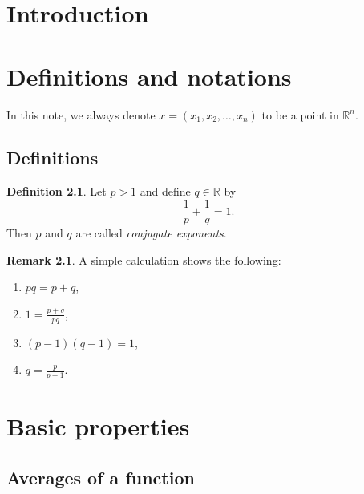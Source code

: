 \documentclass[11pt,a4paper]{report}
\theoremstyle{definition}
\newtheorem{definition}[theorem]{Definition}
\newtheorem{remark}[theorem]{Remark}
\begin{document}
\newpage 

\chapter{Introduction} 


\chapter{Definitions and notations} 

In this note, we always denote $x=(x_1, x_2, \ldots, x_n)$ to be a point in $\mathbb{R}^{n}$.

\section{Definitions}

\begin{definition}
    Let $p>1$ and define $q \in \mathbb{R}$ by 
    \begin{equation*} 
        \frac{1}{p} + \frac{1}{q} = 1.
    \end{equation*}
    Then $p$ and $q$ are called \emph{conjugate exponents}.
\end{definition}

\begin{remark}
    A simple calculation shows the following:
    \begin{enumerate}[label=(\roman*)] 
    \rm\item $pq = p + q$,
    \rm\item $\displaystyle 1 = \frac{p+q}{pq}$,
    \rm\item $(p-1)(q-1)=1$,
    \rm\item $\displaystyle q= \frac{p}{p-1}$.
    \end{enumerate}
\end{remark}

\chapter{Basic properties}

\section{Averages of a function}
\end{document}
